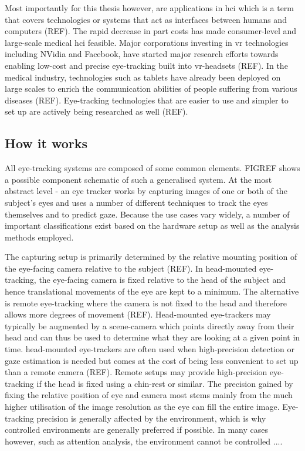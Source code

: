 Most importantly for this thesis however, are applications in \acrfull{hci} which is a term that covers technologies or systems that act as interfaces between humans and computers (REF). The rapid decrease in part costs has made consumer-level and large-scale medical \acrlong{hci} feasible. Major corporations investing in \acrfull{vr} technologies including NVidia and Facebook, have started major research efforts towards enabling low-cost and precise eye-tracking built into \acrshort{vr}-headsets (REF). In the medical industry, technologies such as tablets have already been deployed on large scales to enrich the communication abilities of people suffering from various diseases (REF). Eye-tracking technologies that are easier to use and simpler to set up are actively being researched as well (REF). 

\subsection{How it works}
All eye-tracking systems are composed of some common elements. FIGREF shows a possible component schematic of such a generalised system. At the most abstract level - an eye tracker works by capturing images of one or both of the subject's eyes and uses a number of different techniques to track the eyes themselves and to predict gaze. Because the use cases vary widely, a number of important classifications exist based on the hardware setup as well as the analysis methods employed.

The capturing setup is primarily determined by the relative mounting position of the eye-facing camera relative to the subject (REF). In \gls{head-mounted} \gls{eye-tracking},  the eye-facing camera is fixed relative to the head of the subject and hence translational movements of the eye are kept to a minimum. The alternative is remote \gls{eye-tracking} where the camera is not fixed to the head and therefore allows more degrees of movement (REF). Head-mounted eye-trackers may typically be augmented by a \gls{scene-camera} which points directly away from their head and can thus be used to determine what they are looking at a given point in time. \Gls{head-mounted} \gls{eye-tracker}s are often used when high-precision detection or gaze estimation is needed but comes at the cost of being less convenient to set up than a remote camera (REF). Remote setups may provide high-precision eye-tracking if the head is fixed using a chin-rest or similar. The precision gained by fixing the relative position of eye and camera most stems mainly from the much higher utilisation of the image resolution as the eye can fill the entire image. Eye-tracking precision is generally affected by the environment, which is why controlled environments are generally preferred if possible. In many cases however, such as attention analysis, the environment cannot be controlled .... 

